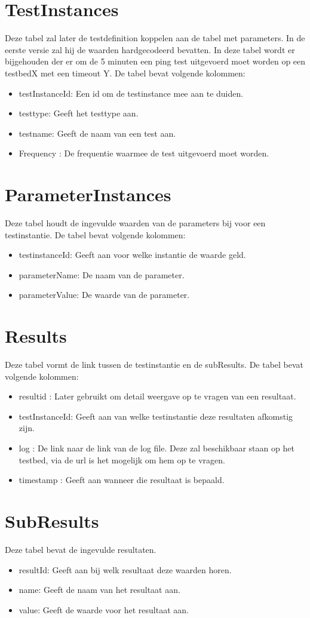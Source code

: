 \section{TestInstances}
Deze tabel zal later de testdefinition koppelen aan de tabel met parameters. In de eerste versie zal hij de waarden hardgecodeerd bevatten.
In deze tabel wordt er bijgehouden der er om de 5 minuten een ping test uitgevoerd moet worden op een testbedX met een timeout Y.
De tabel bevat volgende kolommen: 
\begin{itemize}
\item testInstanceId: Een id om de testinstance mee aan te duiden.
\item testtype: Geeft het testtype aan.
\item testname: Geeft de naam van een test aan.
\item Frequency : De frequentie waarmee de test uitgevoerd moet worden.
\end{itemize}
\section{ParameterInstances}
Deze tabel houdt de ingevulde waarden van de parameters bij voor een testinstantie.
De tabel bevat volgende kolommen:
\begin{itemize}
\item testinstanceId: Geeft aan voor welke instantie de waarde geld.
\item parameterName: De naam van de parameter.
\item parameterValue: De waarde van de parameter.
\end{itemize}

\section{Results}
Deze tabel vormt de link tussen de testinstantie en de subResults.
De tabel bevat volgende kolommen:
\begin{itemize}
\item resultid : Later gebruikt om detail weergave op te vragen van een resultaat.
\item testInstanceId: Geeft aan van welke testinstantie deze resultaten afkomstig zijn.
\item log : De link naar de link van de log file. Deze zal beschikbaar staan op het testbed, via de url is het mogelijk om hem op te vragen.
\item timestamp : Geeft aan wanneer die resultaat is bepaald.
\end{itemize}
\section{SubResults}
Deze tabel bevat de ingevulde resultaten.
\begin{itemize}
\item resultId: Geeft aan bij welk resultaat deze waarden horen.
\item name: Geeft de naam van het resultaat aan.
\item value: Geeft de waarde voor het resultaat aan.
\end{itemize}